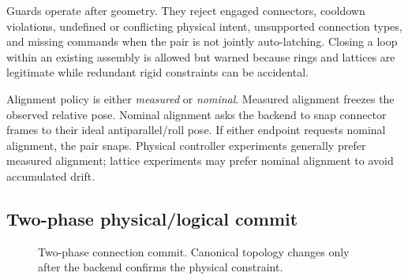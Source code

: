 Guards operate after geometry. They reject engaged connectors, cooldown violations,
undefined or conflicting physical intent, unsupported connection types, and missing
commands when the pair is not jointly auto-latching. Closing a loop within an existing
assembly is allowed but warned because rings and lattices are legitimate while
redundant rigid constraints can be accidental.

Alignment policy is either \emph{measured} or \emph{nominal}. Measured alignment freezes
the observed relative pose. Nominal alignment asks the backend to snap connector frames
to their ideal antiparallel/roll pose. If either endpoint requests nominal alignment,
the pair snaps. Physical controller experiments generally prefer measured alignment;
lattice experiments may prefer nominal alignment to avoid accumulated drift.

\subsection{Two-phase physical/logical commit}

\begin{figure}[htbp]
\centering
{}
\caption{Two-phase connection commit. Canonical topology changes only after the
backend confirms the physical constraint.}
\label{fig:two-phase}
\end{figure}

